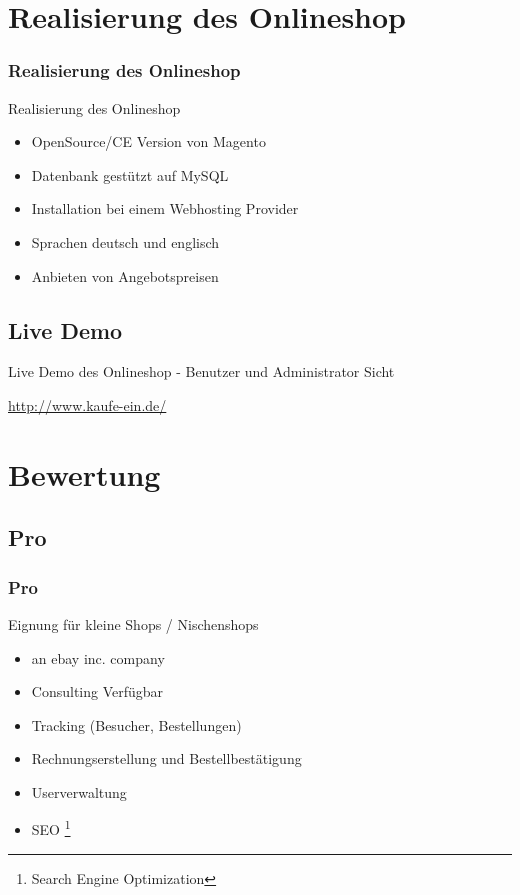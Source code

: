 \documentclass[xcolor=dvipsnames]{beamer}
\begin{document}
\section{Realisierung des Onlineshop}
\begin{frame} %
  \frametitle{Realisierung des Onlineshop} %
  \begin{block}{Realisierung des Onlineshop}
	  \begin{itemize}
		\item OpenSource/CE Version von Magento
		\item Datenbank gestützt auf MySQL
		\item Installation bei einem Webhosting Provider
		\item Sprachen deutsch und englisch
		\item Anbieten von Angebotspreisen
	  \end{itemize}
  \end{block}
\end{frame}

\subsection{Live Demo}
\begin{frame} %
  \begin{exampleblock}{Live Demo des Onlineshop - Benutzer und Administrator Sicht}
	\begin{center}
		\vspace{1 cm}
		\url{http://www.kaufe-ein.de/}
		\vspace{1 cm}
	\end{center}
  \end{exampleblock}
\end{frame}

\section{Bewertung}
\begin{frame} %
\end{frame}

\subsection{Pro}
\begin{frame} %
  \frametitle{Pro} %
  \begin{block}{Eignung für kleine Shops / Nischenshops }
	  \begin{itemize}
		\item an ebay inc. company
		\item Consulting Verfügbar
		\item Tracking (Besucher, Bestellungen)
		\item Rechnungserstellung und Bestellbestätigung
		\item Userverwaltung
		\item SEO \footnote{Search Engine Optimization}
	  \end{itemize}
  \end{block}
\end{frame}
\end{document}
